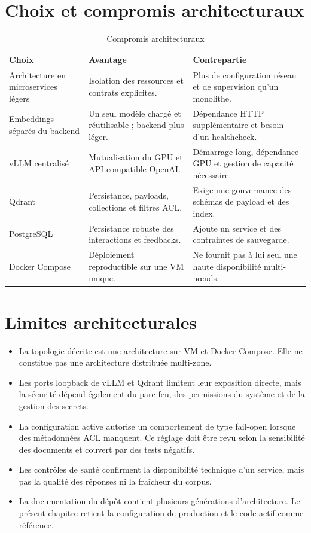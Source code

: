 
\section{Choix et compromis architecturaux}

\begin{table}[H]
\centering
\caption{Compromis architecturaux}
\label{tab:tradeoffs_ch5}
\begin{tabular}{p{3.5cm}p{5.0cm}p{4.8cm}}
\toprule
\textbf{Choix} & \textbf{Avantage} & \textbf{Contrepartie} \\
\midrule
Architecture en microservices légers & Isolation des ressources et contrats explicites. & Plus de configuration réseau et de supervision qu’un monolithe. \\
Embeddings séparés du backend & Un seul modèle chargé et réutilisable ; backend plus léger. & Dépendance HTTP supplémentaire et besoin d’un healthcheck. \\
vLLM centralisé & Mutualisation du GPU et API compatible OpenAI. & Démarrage long, dépendance GPU et gestion de capacité nécessaire. \\
Qdrant & Persistance, payloads, collections et filtres ACL. & Exige une gouvernance des schémas de payload et des index. \\
PostgreSQL & Persistance robuste des interactions et feedbacks. & Ajoute un service et des contraintes de sauvegarde. \\
Docker Compose & Déploiement reproductible sur une VM unique. & Ne fournit pas à lui seul une haute disponibilité multi-nœuds. \\
\bottomrule
\end{tabular}
\end{table}

\section{Limites architecturales}

\begin{itemize}
\item La topologie décrite est une architecture sur VM et Docker Compose. Elle ne constitue pas une architecture distribuée multi-zone.
\item Les ports loopback de vLLM et Qdrant limitent leur exposition directe, mais la sécurité dépend également du pare-feu, des permissions du système et de la gestion des secrets.
\item La configuration active autorise un comportement de type fail-open lorsque des métadonnées ACL manquent. Ce réglage doit être revu selon la sensibilité des documents et couvert par des tests négatifs.
\item Les contrôles de santé confirment la disponibilité technique d’un service, mais pas la qualité des réponses ni la fraîcheur du corpus.
\item La documentation du dépôt contient plusieurs générations d’architecture. Le présent chapitre retient la configuration de production et le code actif comme référence.
\end{itemize}

